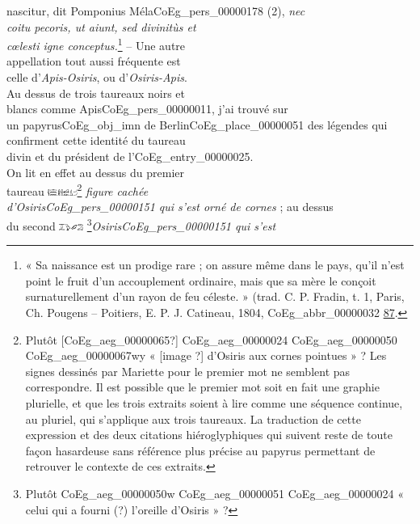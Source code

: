 \documentclass{book}
\begin{document}
{\begin{paracol}{2}
{nascitur}, dit Pomponius Méla\gls{CoEg_pers_00000178} (2), \textit{nec\\
coitu pecoris, ut aiunt, sed divinitùs et\\
cœlesti igne conceptus.}\footnote{« Sa naissance est un prodige rare ; on assure même dans le pays, qu’il n’est point le fruit d’un accouplement ordinaire, mais que sa mère le conçoit surnaturellement d’un rayon de feu céleste. » (trad. C. P. Fradin, t. 1, Paris, Ch. Pougens – Poitiers, E. P. J. Catineau, 1804, \gls{CoEg_abbr_00000032} \href{https://gallica.bnf.fr/ark:/12148/bpt6k6529663b/f128.image}{87}.} – Une autre\\
appellation tout aussi fréquente est\\
celle d’\textit{Apis-Osiris}, ou d’\textit{Osiris-Apis}.\\
Au dessus de trois taureaux noirs et\\
blancs comme Apis\gls{CoEg_pers_00000011}, j’ai trouvé sur\\
un papyrus\gls{CoEg_obj_imn} de Berlin\gls{CoEg_place_00000051} des légendes qui\\
confirment cette identité du taureau\\
divin et du président de l’\gls{CoEg_entry_00000025}.\\
On lit en effet au dessus du premier\\
taureau \includegraphics[height=6pt]{CoEg_Mariette_hiero_1857-04-01_9_3.png}\footnote{Plutôt [\foreignlanguage{translit}{\Gls{CoEg_aeg_00000065}}?] \foreignlanguage{translit}{\gls{CoEg_aeg_00000024} \gls{CoEg_aeg_00000050} \gls{CoEg_aeg_00000067}wy} « [image ?] d'Osiris aux cornes pointues » ? Les signes dessinés par Mariette pour le premier mot ne semblent pas correspondre. Il est possible que le premier mot soit en fait une graphie plurielle, et que les trois extraits soient à lire comme une séquence continue, au pluriel, qui s'applique aux trois taureaux. La traduction de cette expression et des deux citations hiéroglyphiques qui suivent reste de toute façon hasardeuse sans référence plus précise au papyrus permettant de retrouver le contexte de ces extraits.} \textit{figure cachée\\
d’Osiris\gls{CoEg_pers_00000151} qui s’est orné de cornes} ; au dessus\\
du second \includegraphics[height=6pt]{CoEg_Mariette_hiero_1857-04-01_9_4.png} \footnote{Plutôt \foreignlanguage{translit}{\gls{CoEg_aeg_00000050}w \gls{CoEg_aeg_00000051} \gls{CoEg_aeg_00000024}} « celui qui a fourni (?) l'oreille d'Osiris » ?}\textit{Osiris\gls{CoEg_pers_00000151} qui s’est\\
}
\end{paracol}}
\end{document}
